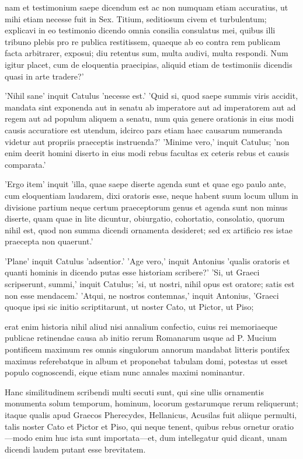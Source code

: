  nam et testimonium saepe dicendum est ac non numquam etiam accuratius, ut mihi etiam necesse fuit in Sex. Titium, seditiosum civem et turbulentum; explicavi in eo testimonio dicendo omnia consilia consulatus mei, quibus illi tribuno plebis pro re publica restitissem, quaeque ab eo contra rem publicam facta arbitrarer, exposui; diu retentus sum, multa audivi, multa respondi. Num igitur placet, cum de eloquentia praecipias, aliquid etiam de testimoniis dicendis quasi in arte tradere?'

 'Nihil sane' inquit Catulus 'necesse est.' 'Quid si, quod saepe summis viris accidit, mandata sint exponenda aut in senatu ab imperatore aut ad imperatorem aut ad regem aut ad populum aliquem a senatu, num quia genere orationis in eius modi causis accuratiore est utendum, idcirco pars etiam haec causarum numeranda videtur aut propriis praeceptis instruenda?' 'Minime vero,' inquit Catulus; 'non enim deerit homini diserto in eius modi rebus facultas ex ceteris rebus et causis comparata.'

 'Ergo item' inquit 'illa, quae saepe diserte agenda sunt et quae ego paulo ante, cum eloquentiam laudarem, dixi oratoris esse, neque habent suum locum ullum in divisione partium neque certum praeceptorum genus et agenda sunt non minus diserte, quam quae in lite dicuntur, obiurgatio, cohortatio, consolatio, quorum nihil est, quod non summa dicendi ornamenta desideret; sed ex artificio res istae praecepta non quaerunt.'

 'Plane' inquit Catulus 'adsentior.' 'Age vero,' inquit Antonius 'qualis oratoris et quanti hominis in dicendo putas esse historiam scribere?' 'Si, ut Graeci scripserunt, summi,' inquit Catulus; 'si, ut nostri, nihil opus est oratore; satis est non esse mendacem.' 'Atqui, ne nostros contemnas,' inquit Antonius, 'Graeci quoque ipsi sic initio scriptitarunt, ut noster Cato, ut Pictor, ut Piso;

 erat enim historia nihil aliud nisi annalium confectio, cuius rei memoriaeque publicae retinendae causa ab initio rerum Romanarum usque ad P. Mucium pontificem maximum res omnis singulorum annorum mandabat litteris pontifex maximus referebatque in album et proponebat tabulam domi, potestas ut esset populo cognoscendi, eique etiam nunc annales maximi nominantur.

 Hanc similitudinem scribendi multi secuti sunt, qui sine ullis ornamentis monumenta solum temporum, hominum, locorum gestarumque rerum reliquerunt; itaque qualis apud Graecos Pherecydes, Hellanicus, Acusilas fuit aliique permulti, talis noster Cato et Pictor et Piso, qui neque tenent, quibus rebus ornetur oratio—modo enim huc ista sunt importata—et, dum intellegatur quid dicant, unam dicendi laudem putant esse brevitatem.

